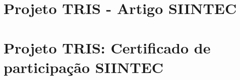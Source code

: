 \documentclass[fancyheadings, fancychapter, sureport]{Classes/a-prj}
\begin{document}
\begin{thesisappendices}
        \chapter{Projeto TRIS - Artigo SIINTEC}
        \label{app:trispaper}
        
        
        \chapter{Projeto TRIS: Certificado de participação SIINTEC}
        \label{app:certif}
        
    \end{thesisappendices}
%
%
    
\end{document}
